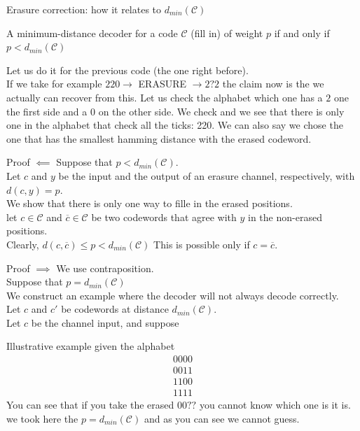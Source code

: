 \begin{parag}{Erasure correction: how it relates to $d_{min}\left(\mathcal{C}\right)$}
    \begin{theoreme}
        A minimum-distance decoder for a code $\mathcal{C}$  (fill in)  of weight $p$ if and only if $p < d_{min}\left(\mathcal{C}\right)$
    \end{theoreme}
    Let us do it for the previous code (the one right before).\\
    If we take for example $220 \to $ ERASURE $\to 2?2$ the claim now is the we actually can recover from this. Let us check the alphabet which one has a $2$ one the first side and a $0$ on the other side. We check and we see that there is only one in the alphabet that check all the ticks: 220. We can also say we chose the one that has the smallest hamming distance with the erased codeword.
\end{parag}
\begin{parag}{Proof $\impliedby$}
    Suppose that $ p < d_{min}\left(\mathcal{C}\right)$.\\
    Let $c$ and $ y $ be the input and the output of an erasure channel, respectively, with $d\left(c, y\right) = p$.\\
    We show that there is only one way to fille in the erased positions.\\
    let $c \in \mathcal{C}$ and $\overline{c} \in \mathcal{C}$ be two codewords that agree with $y$ in the non-erased positions.\\
    Clearly, $d\left(c, \overline{c}\right) \leq p < d_{min}\left(\mathcal{C}\right)$ This is possible only if $c = \overline{c}$.
\end{parag}
\begin{parag}{Proof $\implies$}
    We use contraposition.\\
    Suppose that $p= d_{min}\left(\mathcal{C}\right)$\\
    We construct an example where the decoder will not always decode correctly.\\
    Let $c$ and $c'$ be codewords at distance $d_{min}\left(\mathcal{C}\right)$.\\
    Let $c$ be the channel input, and suppose
    
    \begin{subparag}{Illustrative example}
        given the alphabet
        \begin{align*} 0000\\0011\\1100\\1111 \end{align*}
        You can see that if you take the erased $00??$ you cannot know which one is it is. we took here the $p = d_{min}\left(\mathcal{C}\right)$ and as you can see we cannot guess.
        
    \end{subparag}
\end{parag}
